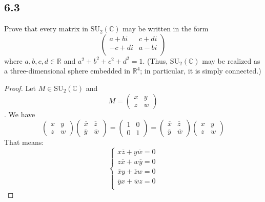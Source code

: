 \documentclass[a4paper, pdf, 12pt]{article}
\begin{document}
\subsection*{6.3}
Prove that every matrix in $\mbox{SU}_2(\mathbb{C})$ may be written in the form
$$
  \begin{pmatrix}
    a + bi  & c + di \\
    -c + di & a - bi \\
  \end{pmatrix}
$$
where $a, b, c, d \in \mathbb{R}$ and $a^2 + b^2 + c^2 + d^2 = 1$. (Thus, $\mbox{SU}_2(\mathbb{C})$ may be realized as
a three-dimensional sphere embedded in $\mathbb{R}^{4}$; in particular, it is simply connected.)

\begin{proof}
  Let $M\in \mbox{SU}_{2}(\mathbb{C})$ and
  $$
    M = \begin{pmatrix}
      x & y \\
      z & w
    \end{pmatrix}
  $$. We have $$
    \begin{pmatrix}
      x & y \\
      z & w
    \end{pmatrix}
    \begin{pmatrix}
      \overline{x} & \overline{z} \\
      \overline{y} & \overline{w}
    \end{pmatrix} = \begin{pmatrix}
      1 & 0 \\
      0 & 1
    \end{pmatrix}
    = \begin{pmatrix}
      \overline{x} & \overline{z} \\
      \overline{y} & \overline{w}
    \end{pmatrix}
    \begin{pmatrix}
      x & y \\
      z & w
    \end{pmatrix}
  $$
  That means: $$
    \begin{cases}
      x\overline{z} + y\overline{w} = 0 \\
      z\overline{x} + w\overline{y} = 0 \\
      \overline{x}y + \overline{z}w = 0 \\
      \overline{y}x + \overline{w}z = 0 \\
    \end{cases}
  $$
\end{proof}
\end{document}
